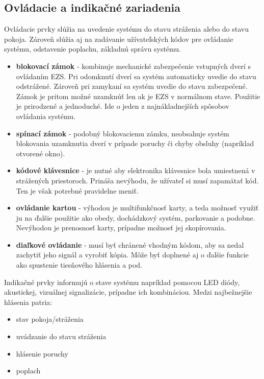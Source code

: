\subsection{Ovládacie a indikačné zariadenia}

Ovládacie prvky slúžia na uvedenie systému do stavu stráženia alebo do stavu pokoja. Zároveň slúžia aj na zadávanie užívateľských kódov pre ovládanie systému, odstavenie poplachu, základnú správu systému.
\begin{itemize}
    \item \textbf{blokovací zámok} - kombinuje mechanické zabezpečenie vstupných dverí s ovládaním EZS. Pri odomknutí dverí sa systém automaticky uvedie do stavu odstrážené. Zároveň pri zamykaní sa systém uvedie do stavu zabezpečené. Zámok je pritom možné uzamknúť len ak je EZS v normálnom stave. Použitie je prirodzené a jednoduché. Ide o jeden z najnákladnejších spôsobov ovládania systému.
    \item \textbf{spínací zámok} - podobný blokovaciemu zámku, neobsahuje systém blokovania uzamknutia dverí v prípade poruchy či chyby obsluhy (napríklad otvorené okno).
    \item \textbf{kódové klávesnice} - je nutné aby elektronika klávesnice bola umiestnená v strážených priestoroch. Prináša nevýhodu, že užívateľ si musí zapamätať kód. Ten je však potrebné pravidelne meniť.
    \item \textbf{ovládanie kartou} - výhodou je multifunkčnosť karty, a teda možnosť využiť ju na ďalšie použitie ako obedy, dochádzkový systém, parkovanie a podobne. Nevýhodou je prenosnosť karty, prípadne možnosť jej skopírovania.
    \item \textbf{diaľkové ovládanie} - musí byť chránené vhodným kódom, aby sa nedal zachytiť jeho signál a vyrobiť kópia. Môže byť doplnené aj o ďalšie funkcie ako spustenie tiesňového hlásenia a pod.\cite{velas_ezs}
\end{itemize}

Indikačné prvky informujú o stave systému napríklad pomocou LED diódy, akustickej, vizuálnej signalizácie, prípadne ich kombináciou. Medzi najbežnejšie hlásenia patria:
\begin{itemize}
    \item stav pokoja/stráženia
    \item uvádzanie do stavu stráženia
    \item hlásenie poruchy
    \item poplach
\end{itemize}

